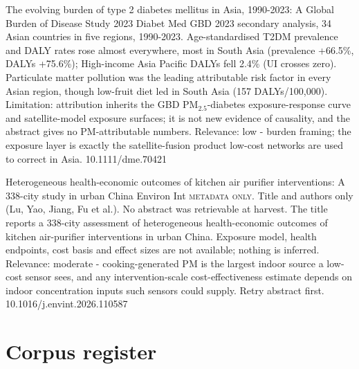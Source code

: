 \documentclass[10pt]{article}
\begin{document}
{The evolving burden of type 2 diabetes mellitus in Asia, 1990-2023: A Global Burden of Disease Study 2023}
{Diabet Med}
{GBD 2023 secondary analysis, 34 Asian countries in five regions, 1990-2023. Age-standardised T2DM prevalence and DALY rates rose almost everywhere, most in South Asia (prevalence +66.5\%, DALYs +75.6\%); High-income Asia Pacific DALYs fell 2.4\% (UI crosses zero). Particulate matter pollution was the leading attributable risk factor in every Asian region, though low-fruit diet led in South Asia (157 DALYs/100,000). Limitation: attribution inherits the GBD PM$_{2.5}$-diabetes exposure-response curve and satellite-model exposure surfaces; it is not new evidence of causality, and the abstract gives no PM-attributable numbers. Relevance: low - burden framing; the exposure layer is exactly the satellite-fusion product low-cost networks are used to correct in Asia.}
{10.1111/dme.70421}

{Heterogeneous health-economic outcomes of kitchen air purifier interventions: A 338-city study in urban China}
{Environ Int}
{\textsc{metadata only.} Title and authors only (Lu, Yao, Jiang, Fu et al.). No abstract was retrievable at harvest. The title reports a 338-city assessment of heterogeneous health-economic outcomes of kitchen air-purifier interventions in urban China. Exposure model, health endpoints, cost basis and effect sizes are not available; nothing is inferred. Relevance: moderate - cooking-generated PM is the largest indoor source a low-cost sensor sees, and any intervention-scale cost-effectiveness estimate depends on indoor concentration inputs such sensors could supply. Retry abstract first.}
{10.1016/j.envint.2026.110587}

\clearpage
\section*{\sffamily\bfseries\color{Deep}Corpus register}
\vspace{-1.5mm}{\color{Amber}\rule{\linewidth}{1.1pt}}\vspace{2.5mm}



\vspace{2mm}
\end{document}
